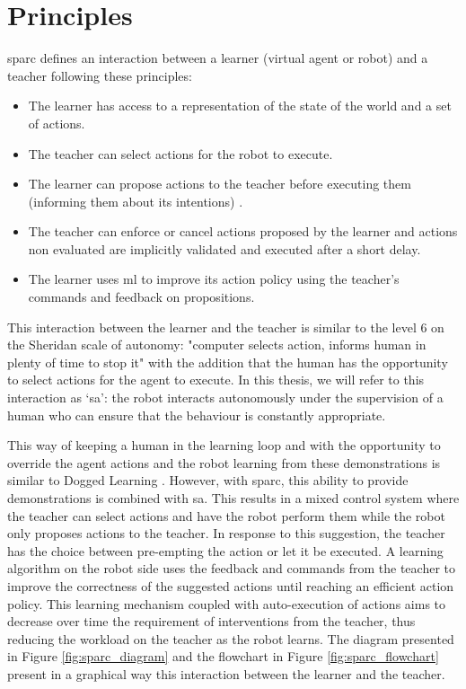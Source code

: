 \section{Principles} \label{sec:sparc_principles}

\gls{sparc} defines an interaction between a learner (virtual agent or robot) and a teacher following these principles:
\begin{itemize}
	\item The learner has access to a representation of the state of the world and a set of actions.
	\item The teacher can select actions for the robot to execute.
	\item The learner can propose actions to the teacher before executing them (informing them about its intentions) .
	\item The teacher can enforce or cancel actions proposed by the learner and actions non evaluated are implicitly validated and executed after a short delay.
	\item The learner uses \gls{ml} to improve its action policy using the teacher's commands and feedback on propositions.
\end{itemize} 

This interaction between the learner and the teacher is similar to the level 6 on the Sheridan scale of autonomy: "computer selects action, informs human in plenty of time to stop it" \citep{sheridan1978human} with the addition that the human has the opportunity to select actions for the agent to execute. In this thesis, we will refer to this interaction as `\gls{sa}': the robot interacts autonomously under the supervision of a human who can ensure that the behaviour is constantly appropriate.

This way of keeping a human in the learning loop and with the opportunity to override the agent actions and the robot learning from these demonstrations is similar to Dogged Learning \citep{grollman2007dogged}. However, with \gls{sparc}, this ability to provide demonstrations is combined with \gls{sa}. This results in a mixed control system where the teacher can select actions and have the robot perform them while the robot only proposes actions to the teacher. In response to this suggestion, the teacher has the choice between pre-empting the action or let it be executed. A learning algorithm on the robot side uses the feedback and commands from the teacher to improve the correctness of the suggested actions until reaching an efficient action policy. This learning mechanism coupled with auto-execution of actions aims to decrease over time the requirement of interventions from the teacher, thus reducing the workload on the teacher as the robot learns. The diagram presented in Figure \ref{fig:sparc_diagram} and the flowchart in Figure \ref{fig:sparc_flowchart} present in a graphical way this interaction between the learner and the teacher.

